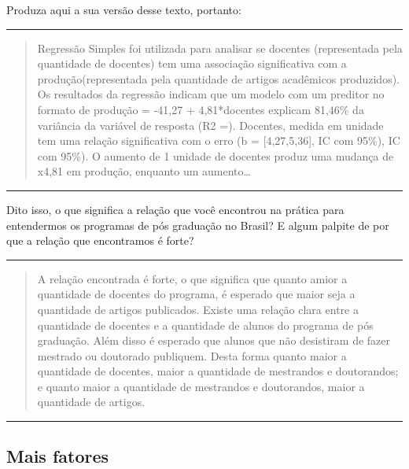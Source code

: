 \documentclass[
]{article}
\begin{document}
Produza aqui a sua versão desse texto, portanto:

\begin{center}\rule{0.5\linewidth}{0.5pt}\end{center}

\begin{quote}
Regressão Simples foi utilizada para analisar se docentes (representada
pela quantidade de docentes) tem uma associação significativa com a
produção(representada pela quantidade de artigos acadêmicos produzidos).
Os resultados da regressão indicam que um modelo com um preditor no
formato de produção = -41,27 + 4,81*docentes explicam 81,46\% da
variância da variável de resposta (R2 =). Docentes, medida em unidade
tem uma relação significativa com o erro (b = {[}4,27,5,36{]}, IC com
95\%), IC com 95\%). O aumento de 1 unidade de docentes produz uma
mudança de x4,81 em produção, enquanto um aumento\ldots{}
\end{quote}

\begin{center}\rule{0.5\linewidth}{0.5pt}\end{center}

Dito isso, o que significa a relação que você encontrou na prática para
entendermos os programas de pós graduação no Brasil? E algum palpite de
por que a relação que encontramos é forte?

\begin{center}\rule{0.5\linewidth}{0.5pt}\end{center}

\begin{quote}
A relação encontrada é forte, o que significa que quanto amior a
quantidade de docentes do programa, é esperado que maior seja a
quantidade de artigos publicados. Existe uma relação clara entre a
quantidade de docentes e a quantidade de alunos do programa de pós
graduação. Além disso é esperado que alunos que não desistiram de fazer
mestrado ou doutorado publiquem. Desta forma quanto maior a quantidade
de docentes, maior a quantidade de mestrandos e doutorandos; e quanto
maior a quantidade de mestrandos e doutorandos, maior a quantidade de
artigos.
\end{quote}

\begin{center}\rule{0.5\linewidth}{0.5pt}\end{center}

\hypertarget{mais-fatores}{%
\subsection{Mais fatores}\label{mais-fatores}}
\end{document}
